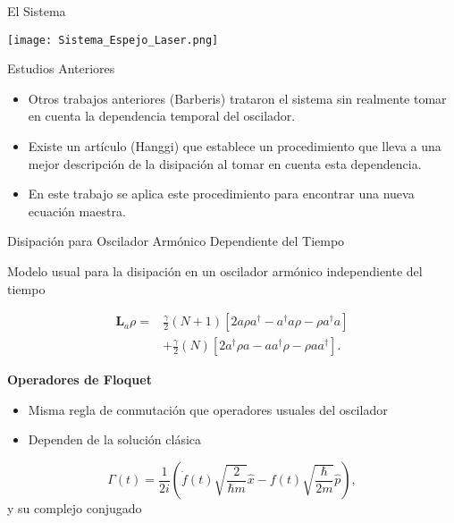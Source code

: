 \documentclass[10pt]{beamer}
\begin{document}
\begin{frame}{El Sistema}

\texttt{[image: Sistema\_Espejo\_Laser.png]} 

\end{frame}

\begin{frame}{Estudios Anteriores}

\begin{itemize}
\item Otros trabajos anteriores (Barberis) trataron el sistema sin realmente tomar en cuenta la dependencia temporal del oscilador.

\item Existe un artículo (Hanggi) que establece un procedimiento que lleva a una mejor descripción de la disipación al tomar en cuenta esta dependencia.

\item En este trabajo se aplica este procedimiento para encontrar una nueva ecuación maestra.

\end{itemize}

\end{frame}

\begin{frame}{Disipación para Oscilador Armónico Dependiente del Tiempo}

Modelo usual para la disipación en un oscilador armónico independiente del tiempo

\begin{align*}
\textbf{L}_a \rho =& \frac{\gamma}{2}(N + 1)[2a\rho a^\dagger -a^\dagger a\rho - \rho a^\dagger a ] \nonumber \\
 &+ \frac{\gamma}{2}(N)[2a^\dagger\rho a -aa^\dagger\rho - \rho  aa^\dagger ].
\end{align*} 

\end{frame}

\begin{frame}

\textbf{Operadores de Floquet}

\begin{itemize}
\item Misma regla de conmutación que operadores usuales del oscilador

\item Dependen de la solución clásica
\end{itemize}

\begin{equation*}
\Gamma(t) = \frac{1}{2i}(\dot{f}(t)\sqrt{\frac{2}{\hbar m}}\hat{x}-f(t)\sqrt{\frac{\hbar}{2m}}\hat{p}),
\end{equation*} y su complejo conjugado

\end{frame}
\end{document}
